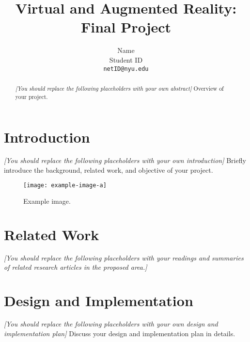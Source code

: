 \documentclass[10pt,twocolumn,letterpaper]{article}
\newcommand{\note}[1]{{\it\color{red} #1}}
\begin{document}
\title{Virtual and Augmented Reality: Final Project}
\author{Name\\Student ID\\{\tt\small netID@nyu.edu}}
\maketitle


\begin{abstract}

\note{[You should replace the following placeholders with your own abstract]}
Overview of your project. 

\end{abstract}


\section{Introduction}
\label{sec:introduction}

\note{[You should replace the following placeholders with your own introduction]}
Briefly introduce the background, related work, and objective of your project. 


\begin{figure}[!t]
  \centering
  \texttt{[image: example-image-a]}
  \caption{Example image.}
  \label{fig:example}
\end{figure}


\section{Related Work}
\label{sec:related}
\note{[You should replace the following placeholders with your readings and summaries of related research articles in the proposed area.]}


\section{Design and Implementation}
\label{sec:design}

\note{[You should replace the following placeholders with your own design and implementation plan]}
Discuss your design and implementation plan in details. 
\end{document}
